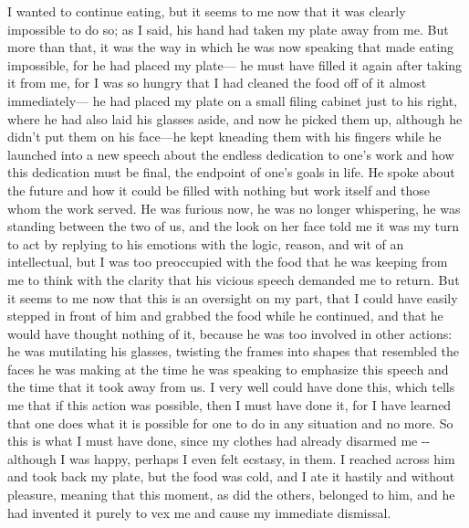\documentclass[
]{memoir}
\begin{document}
I wanted to continue eating, but it seems to me now that it was clearly
impossible to do so; as I said, his hand had taken my plate away from
me. But more than that, it was the way in which he was now speaking that
made eating impossible, for he had placed my plate--- he must have
filled it again after taking it from me, for I was so hungry that I had
cleaned the food off of it almost immediately--- he had placed my plate
on a small filing cabinet just to his right, where he had also laid his
glasses aside, and now he picked them up, although he didn't put them on
his face---he kept kneading them with his fingers while he launched into
a new speech about the endless dedication to one's work and how this
dedication must be final, the endpoint of one's goals in life. He spoke
about the future and how it could be filled with nothing but work itself
and those whom the work served. He was furious now, he was no longer
whispering, he was standing between the two of us, and the look on her
face told me it was my turn to act by replying to his emotions with the
logic, reason, and wit of an intellectual, but I was too preoccupied
with the food that he was keeping from me to think with the clarity that
his vicious speech demanded me to return. But it seems to me now that
this is an oversight on my part, that I could have easily stepped in
front of him and grabbed the food while he continued, and that he would
have thought nothing of it, because he was too involved in other
actions: he was mutilating his glasses, twisting the frames into shapes
that resembled the faces he was making at the time he was speaking to
emphasize this speech and the time that it took away from us. I very
well could have done this, which tells me that if this action was
possible, then I must have done it, for I have learned that one does
what it is possible for one to do in any situation and no more. So this
is what I must have done, since my clothes had already disarmed me -\/-
although I was happy, perhaps I even felt ecstasy, in them. I reached
across him and took back my plate, but the food was cold, and I ate it
hastily and without pleasure, meaning that this moment, as did the
others, belonged to him, and he had invented it purely to vex me and
cause my immediate dismissal.
\end{document}
